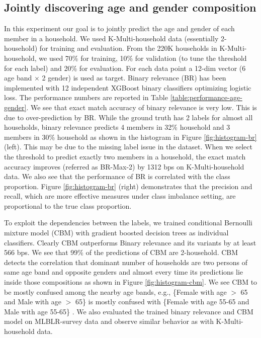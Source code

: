 \subsection{Jointly discovering age and gender composition}
In this experiment our goal is to jointly predict the age and gender of each member in a household. We used K-Multi-household data (essentially 2-household) for training and evaluation. From the 220K households in K-Multi-household, we used 70\% for training, 10\% for validation (to tune the threshold for each label) and 20\% for evaluation. For each data point a 12-dim vector (6 age band $\times$ 2 gender) is used as target.  Binary relevance (BR) has been implemented with 12 independent XGBoost binary classifiers optimizing logistic loss. The performance numbers are reported in Table \ref{table:performance-age-gender}. We see that exact match accuracy of binary relevance is very low. This is due to over-prediction by BR. While the ground truth has 2 labels for almost all households, binary relevance predicts 4 members in 32\% household and 3 members in 30\% household as shown in the histogram in Figure \ref{fig:histogram-br} (left). This may be due to the missing label issue in the dataset. When we select the threshold to predict exactly two members in a household, the exact match accuracy improves (referred as BR-Max-2) by 1312 bps on K-Multi-household data. We also see that the performance of BR is correlated with the class proportion. Figure \ref{fig:histogram-br} (right) demonstrates that the precision and recall, which are more effective measures under class imbalance setting, are proportional to the true class proportion.

To exploit the dependencies between the labels, we trained conditional Bernoulli mixture model (CBM) with gradient boosted decision trees as individual classifiers. Clearly CBM outperforms Binary relevance and its variants by at least 566 bps. We see that 99\% of the predictions of CBM are 2-household. CBM detects the correlation that dominant number of households are two persons of same age band and opposite genders and almost every time its predictions lie inside those compositions as shown in Figure \ref{fig:histogram-cbm}. We see CBM to be mostly confused among the nearby age bands, e.g., \{Female with age $>$ 65 and Male with age $>$ 65\} is mostly confused with \{Female with age 55-65 and Male with age 55-65\} . We also evaluated the trained binary relevance and CBM model on MLBLR-survey data and observe similar behavior as with K-Multi-household data.
%


